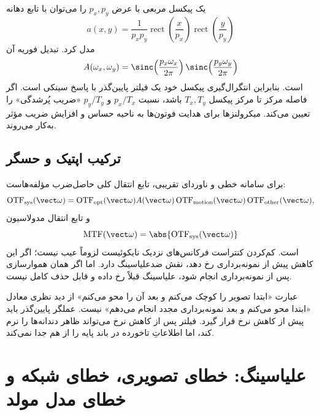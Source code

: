 یک پیکسل مربعی با عرض \(p_x,p_y\) را می‌توان با تابع دهانه
\begin{equation}
a(x,y)=\frac{1}{p_xp_y}
\operatorname{rect}\!\left(\frac{x}{p_x}\right)
\operatorname{rect}\!\left(\frac{y}{p_y}\right)
\end{equation}
مدل کرد. تبدیل فوریه آن
\begin{equation}
A(\omega_x,\omega_y)=
\sinc\!\left(\frac{p_x\omega_x}{2\pi}\right)
\sinc\!\left(\frac{p_y\omega_y}{2\pi}\right)
\end{equation}
است. بنابراین انتگرال‌گیری پیکسل خود یک فیلتر پایین‌گذر با پاسخ سینکی است. اگر فاصله مرکز تا مرکز
پیکسل \(T_x,T_y\) باشد، نسبت \(p_x/T_x\) و \(p_y/T_y\) «ضریب پُرشدگی» را تعیین می‌کند.
میکرولنزها برای هدایت فوتون‌ها به ناحیه حساس و افزایش ضریب مؤثر به‌کار می‌روند.

\subsection{ترکیب اپتیک و حسگر}

برای سامانه خطی و ناوردای تقریبی، تابع انتقال کلی حاصل‌ضرب مؤلفه‌هاست:
\begin{equation}
\operatorname{OTF}_{\mathrm{sys}}(\vect\omega)
=\operatorname{OTF}_{\mathrm{opt}}(\vect\omega)
 A(\vect\omega)
 \operatorname{OTF}_{\mathrm{motion}}(\vect\omega)
 \operatorname{OTF}_{\mathrm{other}}(\vect\omega),
\end{equation}
و تابع انتقال مدولاسیون
\begin{equation}
\operatorname{MTF}(\vect\omega)=
\abs{\operatorname{OTF}_{\mathrm{sys}}(\vect\omega)}
\end{equation}
است. کم‌کردن کنتراست فرکانس‌های نزدیک نایکوئیست لزوماً عیب نیست؛ اگر این کاهش پیش از نمونه‌برداری
رخ دهد، نقش ضدعلیاسینگ دارد. اما اگر همان هموارسازی پس از نمونه‌برداری انجام شود، علیاسینگ
قبلاً رخ داده و قابل حذف کامل نیست.

\begin{warningbox}
عبارت «ابتدا تصویر را کوچک می‌کنم و بعد آن را محو می‌کنم» از دید نظری معادل
«ابتدا محو می‌کنم و بعد نمونه‌برداری مجدد انجام می‌دهم» نیست. عملگر پایین‌گذر باید پیش از کاهش نرخ
قرار گیرد. فیلتر پس از کاهش نرخ می‌تواند ظاهر دندانه‌ها را نرم کند، اما اطلاعاتِ تاخورده در باند پایه
را از هم جدا نمی‌کند.
\end{warningbox}

\section{علیاسینگ: خطای تصویری، خطای شبکه و خطای مدل مولد}

